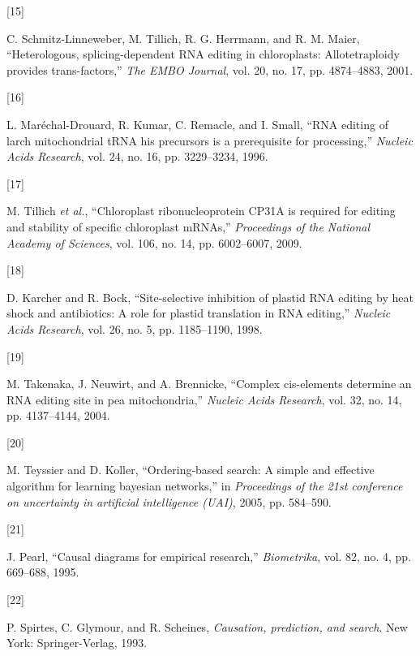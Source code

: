 \documentclass[
]{article}
\newlength{\cslhangindent}
\newlength{\csllabelwidth}
\newenvironment{CSLReferences}[2] %
 {\begin{list}{}{%
  \setlength{\itemindent}{0pt}
  \setlength{\leftmargin}{0pt}
  \setlength{\parsep}{0pt}
  \ifodd #1
   \setlength{\leftmargin}{\cslhangindent}
   \setlength{\itemindent}{-1\cslhangindent}
  \fi
  \setlength{\itemsep}{#2\baselineskip}}}
 {\end{list}}
\newcommand{\CSLLeftMargin}[1]{\parbox[t]{\csllabelwidth}{\strut#1\strut}}
\newcommand{\CSLRightInline}[1]{\parbox[t]{\linewidth - \csllabelwidth}{\strut#1\strut}}
\theoremstyle{definition}
\theoremstyle{remark}
\begin{document}
\begin{CSLReferences}{0}{0}
\CSLLeftMargin{{[}15{]} }%
\CSLRightInline{C. Schmitz‐Linneweber, M. Tillich, R. G. Herrmann, and
R. M. Maier, {``Heterologous, splicing-dependent RNA editing in
chloroplasts: Allotetraploidy provides trans-factors,''} \emph{The EMBO
Journal}, vol. 20, no. 17, pp. 4874--4883, 2001.}

\CSLLeftMargin{{[}16{]} }%
\CSLRightInline{L. Maréchal-Drouard, R. Kumar, C. Remacle, and I. Small,
{``RNA editing of larch mitochondrial tRNA his precursors is a
prerequisite for processing,''} \emph{Nucleic Acids Research}, vol. 24,
no. 16, pp. 3229--3234, 1996.}

\CSLLeftMargin{{[}17{]} }%
\CSLRightInline{M. Tillich \emph{et al.}, {``Chloroplast
ribonucleoprotein CP31A is required for editing and stability of
specific chloroplast mRNAs,''} \emph{Proceedings of the National Academy
of Sciences}, vol. 106, no. 14, pp. 6002--6007, 2009.}

\CSLLeftMargin{{[}18{]} }%
\CSLRightInline{D. Karcher and R. Bock, {``Site-selective inhibition of
plastid RNA editing by heat shock and antibiotics: A role for plastid
translation in RNA editing,''} \emph{Nucleic Acids Research}, vol. 26,
no. 5, pp. 1185--1190, 1998.}

\CSLLeftMargin{{[}19{]} }%
\CSLRightInline{M. Takenaka, J. Neuwirt, and A. Brennicke, {``Complex
cis-elements determine an RNA editing site in pea mitochondria,''}
\emph{Nucleic Acids Research}, vol. 32, no. 14, pp. 4137--4144, 2004.}

\CSLLeftMargin{{[}20{]} }%
\CSLRightInline{M. Teyssier and D. Koller, {``Ordering‑based search: A
simple and effective algorithm for learning bayesian networks,''} in
\emph{Proceedings of the 21st conference on uncertainty in artificial
intelligence (UAI)}, 2005, pp. 584--590.}

\CSLLeftMargin{{[}21{]} }%
\CSLRightInline{J. Pearl, {``Causal diagrams for empirical research,''}
\emph{Biometrika}, vol. 82, no. 4, pp. 669--688, 1995.}

\CSLLeftMargin{{[}22{]} }%
\CSLRightInline{P. Spirtes, C. Glymour, and R. Scheines,
\emph{Causation, prediction, and search}. New York: Springer-Verlag,
1993.}


\end{CSLReferences}
\end{document}
